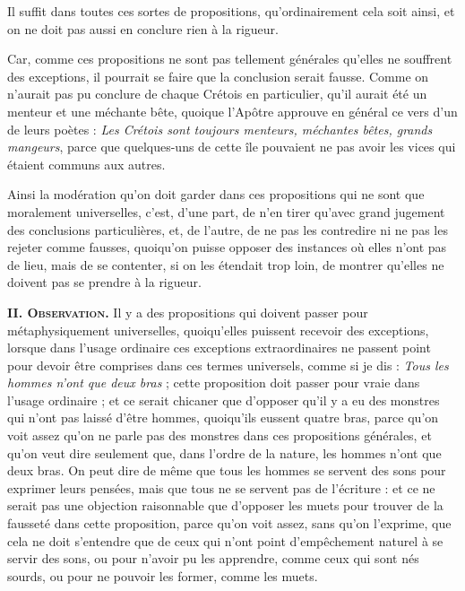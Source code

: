 Il suffit dans toutes ces sortes de propositions, qu'ordinairement cela soit ainsi, et on ne doit pas aussi en conclure rien à la rigueur.

Car, comme ces propositions ne sont pas tellement générales qu'elles ne souffrent des exceptions, il pourrait se faire que la conclusion serait fausse. Comme on n'aurait pas pu conclure de chaque Crétois en particulier, qu'il aurait été un menteur et une méchante bête, quoique l'Apôtre approuve en général ce vers d'un de leurs poètes : \emph{Les Crétois sont toujours menteurs, méchantes bêtes, grands mangeurs}, parce que quelques-uns de cette île pouvaient ne pas avoir les vices qui étaient communs aux autres.

Ainsi la modération qu'on doit garder dans ces propositions qui ne sont que moralement universelles, c'est, d'une part, de n'en tirer qu'avec grand jugement des conclusions particulières, et, de l'autre, de ne pas les contredire ni ne pas les rejeter comme fausses, quoiqu'on puisse opposer des instances où elles n'ont pas de lieu, mais de se contenter, si on les étendait trop loin, de montrer qu'elles ne doivent pas se prendre à la rigueur.

\bigbreak
{\bfseries\scshape II. Observation.} Il y a des propositions qui doivent passer pour métaphysiquement universelles, quoiqu'elles puissent recevoir des exceptions, lorsque dans l'usage ordinaire ces exceptions extraordinaires ne passent point pour devoir être comprises dans ces termes universels, comme si je dis : \emph{Tous les hommes n'ont que deux bras} ; cette proposition doit passer pour vraie dans l'usage ordinaire ; et ce serait chicaner que d'opposer qu'il y a eu des monstres qui n'ont pas laissé d'être hommes, quoiqu'ils eussent quatre bras, parce qu'on voit assez qu'on ne parle pas des monstres dans ces propositions générales, et qu'on veut dire seulement que, dans l'ordre de la nature, les hommes n'ont que deux bras. On peut dire de même que tous les hommes se servent des sons pour exprimer leurs pensées, mais que tous ne se servent pas de l'écriture : et ce ne serait pas une objection raisonnable que d'opposer les muets pour trouver de la fausseté dans cette proposition, parce qu'on voit assez, sans qu'on l'exprime, que cela ne doit s'entendre que de ceux qui n'ont point d'empêchement naturel à se servir des sons, ou pour n'avoir pu les apprendre, comme ceux qui sont nés sourds, ou pour ne pouvoir les former, comme les muets.

